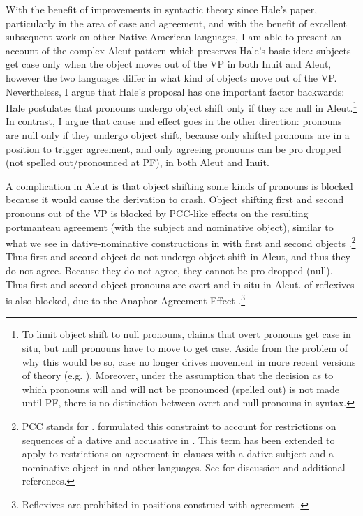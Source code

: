 \documentclass[output=paper]{LSP/langsci}
\begin{document}
With the benefit of improvements in syntactic theory since Hale’s \citeyear{hale1997misumalpan} paper, particularly in the area of case and agreement, and with the benefit of excellent subsequent work on other Native American languages, I am able to present an account of the complex Aleut pattern which preserves Hale’s basic idea: subjects get  case only when the object moves out of the VP in both Inuit and Aleut, however the two languages differ in what kind of objects move out of the VP. Nevertheless, I argue that Hale’s proposal has one important factor backwards: Hale postulates that pronouns undergo object shift only if they are null in Aleut.\footnote{To limit object shift to null pronouns, \citet{hale1997misumalpan} claims that overt pronouns get case in situ, but null pronouns have to move to get case. Aside from the problem of why this would be so, case no longer drives movement in more recent versions of theory (e.g. \citealt{chomsky1995minimalist,Chomsky2000}). Moreover, under the assumption that the decision as to which pronouns will and will not be pronounced (spelled out) is not made until PF, there is no distinction between overt and null pronouns in syntax.} In contrast, I argue that cause and effect goes in the other direction: pronouns are null only if they undergo object shift, because only shifted pronouns are in a position to trigger agreement, and only agreeing pronouns can be pro dropped (not spelled out/pronounced at PF), in both Aleut and Inuit.

A complication in Aleut is that object shifting some kinds of pronouns is blocked because it would cause the derivation to crash. Object shifting first and second  pronouns out of the VP is blocked by PCC-like effects on the resulting portmanteau agreement (with the  subject and nominative object), similar to what we see in dative-nominative constructions in  with first and second  objects \citep{Sigurðsson1996}.\footnote{PCC stands for . \citet{bonet1994person} formulated this constraint to account for  restrictions on sequences of a dative and accusative  in . This term has been extended to apply to  restrictions on agreement in clauses with a dative subject and a nominative object in  and other languages. See \citet{anagnostopoulou2005strong} for discussion and additional references.} Thus first and second  object do not undergo object shift in Aleut, and thus they do not agree. Because they do not agree, they cannot be pro dropped (null). Thus first and second  object pronouns are overt and in situ in Aleut.  of reflexives is also blocked, due to the Anaphor Agreement Effect \citep{rizzi1990anaphor,woolford1999more}.\footnote{Reflexives are prohibited in positions construed with agreement \citep{rizzi1990anaphor}.} 
\end{document}
